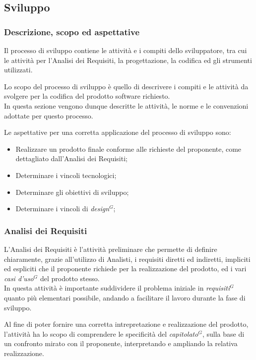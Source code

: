 \subsection{Sviluppo}

\subsubsection{Descrizione, scopo ed aspettative}

Il processo di sviluppo contiene le attività e i compiti dello sviluppatore, tra cui le attività per l’Analisi dei Requisiti, la progettazione, la codifica ed gli strumenti utilizzati.

Lo scopo del processo di sviluppo è quello di descrivere i compiti e le attività da svolgere per la codifica del prodotto software richiesto. \\
In questa sezione vengono dunque descritte le attività, le norme e le convenzioni adottate per questo processo.

Le aspettative per una corretta applicazione del processo di sviluppo sono:
\begin{itemize}
    \item Realizzare un prodotto finale conforme alle richieste del proponente, come dettagliato dall'Analisi dei Requisiti;
    \item Determinare i vincoli tecnologici;
    \item Determinare gli obiettivi di sviluppo;
    \item Determinare i vincoli di \emph{design}$^{G}$;
\end{itemize}
\subsubsection{Analisi dei Requisiti}


L’Analisi dei Requisiti è l’attività preliminare che permette di definire chiaramente, grazie all'utilizzo di Analisti, i requisiti diretti ed indiretti, 
impliciti ed espliciti che il proponente richiede per la realizzazione del prodotto, ed i vari \emph{casi d’uso}$^{G}$ del prodotto stesso. \\
In questa attività è importante suddividere il problema iniziale in \emph{requisiti}$^{G}$ quanto più elementari possibile, andando a facilitare il lavoro durante la fase di sviluppo.

Al fine di poter fornire una corretta intrepretazione e realizzazione del prodotto, l'attività ha lo scopo di comprendere le specificità del \emph{capitolato}$^{G}$, sulla base di un confronto mirato con il proponente, interpretando e ampliando la relativa realizzazione.
\pagebreak
   
